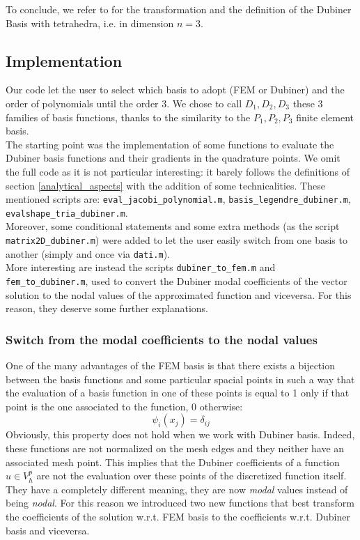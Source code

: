 \documentclass[a4paper,11pt]{article}
\begin{document}
    \noindent To conclude, we refer to \cite{sherwin} for the transformation and the definition of the Dubiner Basis with tetrahedra, i.e. in dimension $n=3$.
    
    \subsection{Implementation}\label{subsection_implementation}
    Our code let the user to select which basis to adopt (FEM or Dubiner) and the order of polynomials until the order 3. We chose to call $D_1,D_2,D_3$ these 3 families of basis functions, thanks to the similarity to the $P_1,P_2,P_3$ finite element basis.\\
    The starting point was the implementation of some functions to evaluate the Dubiner basis functions and their gradients in the quadrature points. We omit the full code as it is not particular interesting: it barely follows the definitions of section \ref{analytical_aspects} with the addition of some technicalities. These mentioned scripts are: \texttt{eval\_jacobi\_polynomial.m}, \texttt{basis\_legendre\_dubiner.m}, \texttt{evalshape\_tria\_dubiner.m}.\\
    
    \noindent Moreover, some conditional statements and some extra methods (as the script \texttt{matrix2D\_dubiner.m}) were added to let the user easily switch from one basis to another (simply and once via \texttt{dati.m}). \\
    
    \noindent More interesting are instead the scripts \texttt{dubiner\_to\_fem.m} and \texttt{fem\_to\_dubiner.m}, used to convert the Dubiner modal coefficients of the vector solution to the nodal values of the approximated function and viceversa. For this reason, they deserve some further explanations.
\subsubsection{Switch from the modal coefficients to the nodal values}
One of the many advantages of the FEM basis is that there exists a bijection between the basis functions and some particular spacial points in such a way that the evaluation of a basis function in one of these points is equal to 1 only if that point is the one associated to the function, 0 otherwise:
	\begin{equation} \label{ref1}
	\psi_i(x_j)=\delta_{ij}
	\end{equation}
	Obviously, this property does not hold when we work with Dubiner basis. Indeed, these functions are not normalized on the mesh edges and they neither have an associated mesh point. This implies that the Dubiner coefficients of a function $u\in V_h^p$ are not the evaluation over these points of the discretized function itself. They have a completely different meaning, they are now \emph{modal} values instead of being \emph{nodal}.
	For this reason we introduced two new functions that best transform the coefficients of the solution w.r.t. FEM basis to the coefficients w.r.t. Dubiner basis and viceversa.\vspace{5mm}
	
\end{document}
